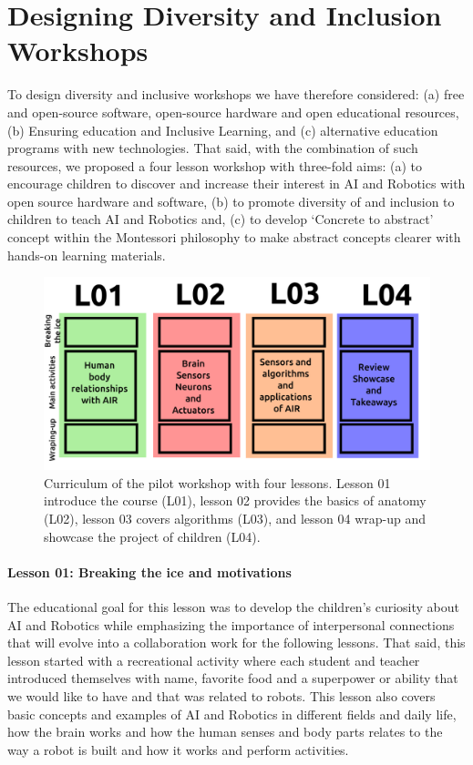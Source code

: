 \documentclass[conference]{IEEEtran}
\begin{document}
\section{Designing Diversity and Inclusion Workshops}
To design diversity and inclusive workshops we have therefore considered: (a) free and open-source software, open-source hardware and open educational resources, (b) Ensuring education and Inclusive Learning, and (c) alternative education programs with new technologies.
That said, with the combination of such resources, we proposed a four lesson workshop with three-fold aims:
(a) to encourage children to discover and increase their interest in AI and Robotics with open source hardware and software, 
(b) to promote  diversity of and inclusion to children to teach AI and Robotics and,
(c) to develop ‘Concrete to abstract’ concept within the Montessori philosophy to make abstract concepts clearer with hands-on learning materials.

\begin{figure}[t]
    \centerline{\includegraphics[width=\linewidth]{curriculum-design/versions/drawing-v03.png}}  %
    \caption{Curriculum of the pilot workshop with four lessons. 
    Lesson 01 introduce the course (L01), 
    lesson 02 provides the basics of anatomy (L02), 
    lesson 03 covers algorithms (L03), and 
    lesson 04 wrap-up and showcase the project of children (L04).
    }
    \label{fig:curriculum}
\end{figure}

\paragraph{Lesson 01: Breaking the ice and motivations} 
The educational goal for this lesson was to develop the children’s curiosity about AI and Robotics while emphasizing the importance of interpersonal connections that will evolve into a collaboration work for the following lessons.
That said, this lesson started with a recreational activity where each student and teacher introduced themselves with name, favorite food and a superpower or ability that we would like to have and that was related to robots. 
This lesson also covers basic concepts and examples of AI and Robotics in different fields and daily life, how the brain works and how the human senses and body parts relates to the way a robot is built and how it works and perform activities.
\end{document}

